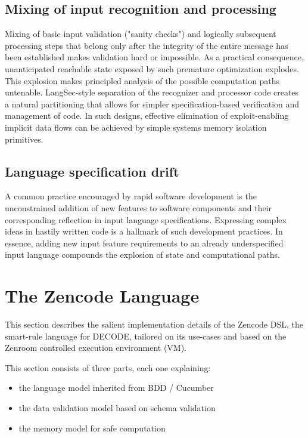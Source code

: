 \documentclass{svproc}
\begin{document}
\subsection{Mixing of input recognition and processing}

Mixing of basic input validation ("sanity checks") and logically
subsequent processing steps that belong only after the integrity of
the entire message has been established makes validation hard or
impossible. As a practical consequence, unanticipated reachable state
exposed by such premature optimization explodes. This explosion makes
principled analysis of the possible computation paths
untenable. LangSec-style separation of the recognizer and processor
code creates a natural partitioning that allows for simpler
specification-based verification and management of code. In such
designs, effective elimination of exploit-enabling implicit data flows
can be achieved by simple systems memory isolation primitives.

\subsection{Language specification drift}

A common practice encouraged by rapid software development is the
unconstrained addition of new features to software components and
their corresponding reflection in input language
specifications. Expressing complex ideas in hastily written code is a
hallmark of such development practices. In essence, adding new input
feature requirements to an already underspecified input language
compounds the explosion of state and computational paths.

%
\section{The Zencode Language}
%

This section describes the salient implementation details of the
Zencode DSL, the smart-rule language for DECODE, tailored on its
use-cases and based on the Zenroom controlled execution environment
(VM).

This section consists of three parts, each one explaining:
\begin{itemize}
\item the language model inherited from BDD / Cucumber
\item the data validation model based on schema validation
\item the memory model for safe computation
\end{itemize}
\end{document}
